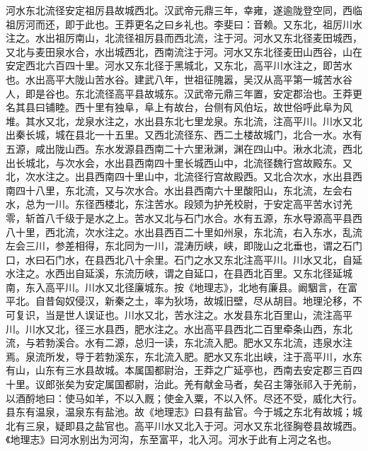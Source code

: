 \documentclass[12pt,UTF8]{ctexbook}
\begin{document}
河水东北流径安定祖厉县故城西北。汉武帝元鼎三年，幸雍，遂逾陇登空同，西临祖厉河而还，即于此也。王莽更名之曰乡礼也。李斐曰：音赖。又东北，祖厉川水注之。水出祖厉南山，北流径祖厉县而西北流，注于河。河水又东北径麦田城西，又北与麦田泉水合，水出城西北，西南流注于河。河水又东北径麦田山西谷，山在安定西北六百四十里。河水又东北径于黑城北，又东北，高平川水注之，即苦水也。水出高平大陇山苦水谷。建武八年，世祖征隗嚣，吴汉从高平第一城苦水谷人，即是谷也。东北流径高平县故城东。汉武帝元鼎三年置，安定郡治也。王莽更名其县曰铺睦。西十里有独阜，阜上有故台，台侧有风伯坛，故世俗呼此阜为风堆。其水又北，龙泉水注之，水出县东北七里龙泉。东北流，注高平川。川水又北出秦长城，城在县北一十五里。又西北流径东、西二土楼故城门，北合一水。水有五源，咸出陇山西。东水发源县西南二十六里湫渊，渊在四山中。湫水北流，西北出长城北，与次水会，水出县西南四十里长城西山中，北流径魏行宫故殿东。又北，次水注之。出县西南四十里山中，北流径行宫故殿西。又北合次水，水出县西南四十八里，东北流，又与次水合。水出县西南六十里酸阳山，东北流，左会右水，总为一川。东径西楼北，东注苦水。段颎为护羌校尉，于安定高平苦水讨羌零，斩首八千级于是水之上。苦水又北与石门水合。水有五源，东水导源高平县西八十里，西北流，次水注之。水出县西百二十里如州泉，东北流，右入东水，乱流左会三川，参差相得，东北同为一川，混涛历峡，峡，即陇山之北垂也，谓之石门口，水曰石门水，在县西北八十余里。石门之水又东北注高平川。川水又北，自延水注之。水西出自延溪，东流历峡，谓之自延口，在县西北百里。又东北径延城南，东入高平川。川水又北径廉城东。按《地理志》，北地有廉县。阚駰言，在富平北。自昔匈奴侵汉，新秦之土，率为狄场，故城旧壁，尽从胡目。地理沦移，不可复识，当是世人误证也。川水又北，苦水注之。水发县东北百里山，流注高平川。川水又北，径三水县西，肥水注之。水出高平县西北二百里牵条山西，东北流，与若勃溪合。水有二源，总归一读，东北流入肥。肥水又东北流，违泉水注焉。泉流所发，导于若勃溪东，东北流入肥。肥水又东北出峡，注于高平川，水东有山，山东有三水县故城。本属国都尉治，王莽之广延亭也，西南去安定郡三百四十里。议郎张矣为安定属国都尉，治此。羌有献金马者，矣召主簿张祁入于羌前，以酒酹地曰：使马如羊，不以入厩；使金入粟，不以入怀。尽还不受，威化大行。县东有温泉，温泉东有盐池。故《地理志》曰县有盐官。今于城之东北有故城；城北有三泉，疑即县之盐官也。高平川水又北入于河。河水又东北径胸卷县故城西。《地理志》曰河水别出为河沟，东至富平，北入河。河水于此有上河之名也。
\end{document}
